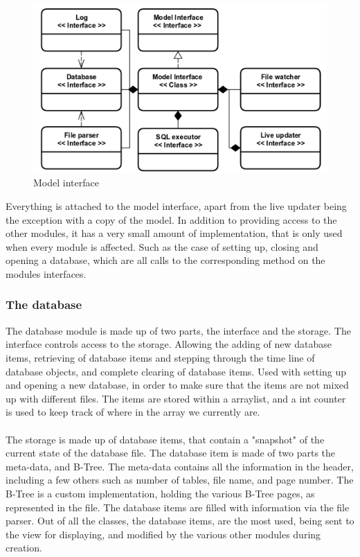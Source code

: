 \begin{figure}[H]
	\centering
	\includegraphics[scale=0.3]{images/model_interface_design.png}
	\caption{Model interface}
	\label{fig:model_interface_design}
\end{figure}

Everything is attached to the model interface, apart from the live updater being the exception with a copy of the model. In addition to providing access to the other modules, it has a very small amount of implementation, that is only used when every module is affected. Such as the case of setting up, closing and opening a database, which are all calls to the corresponding method on the modules interfaces. 

\subsubsection{The database}
\label{subsubsec:databse_imp}

The database module is made up of two parts, the interface and the storage. The interface controls access to the storage. Allowing the adding of new database items, retrieving of database items and stepping through the time line of database objects, and complete clearing of database items. Used with setting up and opening a new database, in order to make sure that the items are not mixed up with different files. The items are stored within a arraylist, and a int counter is used to keep track of where in the array we currently are.
\\\\
The storage is made up of database items, that contain a "snapshot" of the current state of the database file. The database item is made of two parts the meta-data, and B-Tree. The meta-data contains all the information in the header, including a few others such as number of tables, file name, and page number. The B-Tree is a custom implementation, holding the various B-Tree pages, as represented in the file. The database items are filled with information via the file parser. Out of all the classes, the database items, are the most used, being sent to the view for displaying, and modified by the various other modules during creation. 

